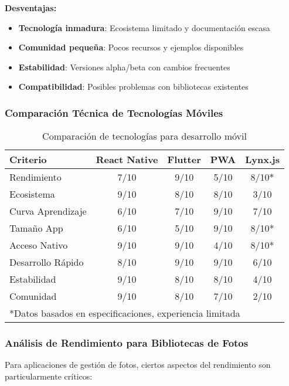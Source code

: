 \textbf{Desventajas:}
\begin{itemize}
    \item \textbf{Tecnología inmadura}: Ecosistema limitado y documentación escasa
    \item \textbf{Comunidad pequeña}: Pocos recursos y ejemplos disponibles
    \item \textbf{Estabilidad}: Versiones alpha/beta con cambios frecuentes
    \item \textbf{Compatibilidad}: Posibles problemas con bibliotecas existentes
\end{itemize}

\subsubsection{Comparación Técnica de Tecnologías Móviles}

\begin{table}[H]
\centering
\begin{tabular}{|l|c|c|c|c|}
\hline
\textbf{Criterio} & \textbf{React Native} & \textbf{Flutter} & \textbf{PWA} & \textbf{Lynx.js} \\
\hline
Rendimiento & 7/10 & 9/10 & 5/10 & 8/10* \\
Ecosistema & 9/10 & 8/10 & 8/10 & 3/10 \\
Curva Aprendizaje & 6/10 & 7/10 & 9/10 & 7/10 \\
Tamaño App & 6/10 & 5/10 & 9/10 & 8/10* \\
Acceso Nativo & 9/10 & 9/10 & 4/10 & 8/10* \\
Desarrollo Rápido & 8/10 & 9/10 & 9/10 & 6/10 \\
Estabilidad & 9/10 & 8/10 & 8/10 & 4/10 \\
Comunidad & 9/10 & 8/10 & 7/10 & 2/10 \\
\hline
\multicolumn{5}{|l|}{*Datos basados en especificaciones, experiencia limitada} \\
\hline
\end{tabular}
\caption{Comparación de tecnologías para desarrollo móvil}
\label{tab:mobile_tech_comparison}
\end{table}

\subsubsection{Análisis de Rendimiento para Bibliotecas de Fotos}

Para aplicaciones de gestión de fotos, ciertos aspectos del rendimiento son particularmente críticos:

